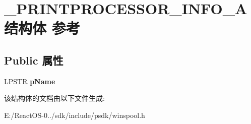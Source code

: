 \hypertarget{struct___p_r_i_n_t_p_r_o_c_e_s_s_o_r___i_n_f_o__1_a}{}\section{\+\_\+\+P\+R\+I\+N\+T\+P\+R\+O\+C\+E\+S\+S\+O\+R\+\_\+\+I\+N\+F\+O\+\_\+A结构体 参考}
\label{struct___p_r_i_n_t_p_r_o_c_e_s_s_o_r___i_n_f_o__1_a}
\subsection*{Public 属性}
\begin{DoxyCompactItemize}
\item 
\mbox{\label{struct___p_r_i_n_t_p_r_o_c_e_s_s_o_r___i_n_f_o__1_a_a11215956e8a30e6212009f6c8252129f}} 
L\+P\+S\+TR {\bfseries p\+Name}
\end{DoxyCompactItemize}


该结构体的文档由以下文件生成\+:\begin{DoxyCompactItemize}
\item 
E\+:/\+React\+O\+S-\/0../sdk/include/psdk/winspool.\+h\end{DoxyCompactItemize}
